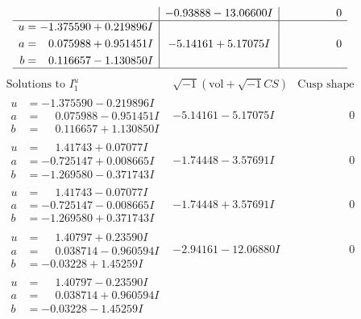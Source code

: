 \documentclass[1p]{elsarticle_modified}
\theoremstyle{definition}
\newcommand{\I}{\sqrt{-1}}
\begin{document}
$$\begin{array}{c|c|c}
 & -0.93888 - 13.06600 I & \phantom{-0.000000 } 0 \\ \hline\begin{aligned}
u &= -1.375590 + 0.219896 I \\
a &= \phantom{-}0.075988 + 0.951451 I \\
b &= \phantom{-}0.116657 - 1.130850 I\end{aligned}
 & -5.14161 + 5.17075 I & \phantom{-0.000000 } 0\\
 \hline 
 \end{array}$$\newpage$$\begin{array}{c|c|c}  
\text{Solutions to }I^u_{1}& \I (\text{vol} + \sqrt{-1}CS) & \text{Cusp shape}\\
 \hline 
\begin{aligned}
u &= -1.375590 - 0.219896 I \\
a &= \phantom{-}0.075988 - 0.951451 I \\
b &= \phantom{-}0.116657 + 1.130850 I\end{aligned}
 & -5.14161 - 5.17075 I & \phantom{-0.000000 } 0 \\ \hline\begin{aligned}
u &= \phantom{-}1.41743 + 0.07077 I \\
a &= -0.725147 + 0.008665 I \\
b &= -1.269580 - 0.371743 I\end{aligned}
 & -1.74448 - 3.57691 I & \phantom{-0.000000 } 0 \\ \hline\begin{aligned}
u &= \phantom{-}1.41743 - 0.07077 I \\
a &= -0.725147 - 0.008665 I \\
b &= -1.269580 + 0.371743 I\end{aligned}
 & -1.74448 + 3.57691 I & \phantom{-0.000000 } 0 \\ \hline\begin{aligned}
u &= \phantom{-}1.40797 + 0.23590 I \\
a &= \phantom{-}0.038714 - 0.960594 I \\
b &= -0.03228 + 1.45259 I\end{aligned}
 & -2.94161 - 12.06880 I & \phantom{-0.000000 } 0 \\ \hline\begin{aligned}
u &= \phantom{-}1.40797 - 0.23590 I \\
a &= \phantom{-}0.038714 + 0.960594 I \\
b &= -0.03228 - 1.45259 I\end{aligned}

\end{array}$$
\end{document}
